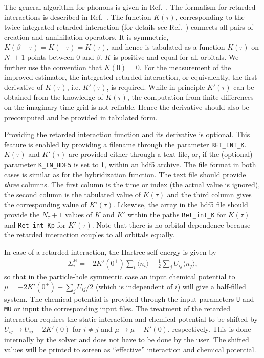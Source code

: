 \documentclass[aps,prb,floatfix,superscriptaddress,twocolumn,notitlepage]{revtex4-1}
\begin{document}
The general algorithm for phonons is given in Ref.~. The formalism for retarded interactions is described in Ref.~. The function $K(\tau)$, corresponding to the twice-integrated retarded interaction (for details see Ref.~) connects all pairs of creation and annihilation operators. It is symmetric, $K(\beta-\tau)=K(-\tau)=K(\tau)$, and hence is tabulated as a function $K(\tau)$ on $N_{\tau}+1$ points between $0$ and $\beta$. $K$ is positive and equal for all orbitals. We further use the convention that $K(0)=0$. For the measurement of the improved estimator, the integrated retarded interaction, or equivalently, the first derivative of $K(\tau)$, i.e. $K'(\tau)$, is required. While in principle $K'(\tau)$ can be obtained from the knowledge of $K(\tau)$, the computation from finite differences on the imaginary time grid is not reliable. Hence the derivative should also be precomputed and be provided in tabulated form.

Providing the retarded interaction function and its derivative is optional. This feature is enabled by providing a filename through the parameter \verb#RET_INT_K#.
$K(\tau)$ and $K'(\tau)$ are provided either through a text file, or, if the (optional) parameter \verb#K_IN_HDF5# is set to 1, within an hdf5 archive.
The file format in both cases is similar as for the hybridization function. The text file should provide \emph{three} columns. The first column is the time or index (the actual value is ignored), the second column is the tabulated value of $K(\tau)$ and the third column gives the corresponding value of $K'(\tau)$.
Likewise, the array in the hdf5 file should provide the $N_{\tau}+1$ values of $K$ and $K'$ within the paths \verb#Ret_int_K# for $K(\tau)$ and \verb#Ret_int_Kp# for $K'(\tau)$.
Note that there is no orbital dependence because the retarded interaction couples to all orbitals equally.

In case of a retarded interaction, the Hartree self-energy is given by
\begin{align}
\Sigma^{\text{H}}_{i} = - 2K'(0^{+})\sum_{i}\langle n_{i}\rangle +\frac{1}{2}\sum_{j}U_{ij}\langle n_{j}\rangle ,
\end{align}
so that in the particle-hole symmetric case an input chemical potential to $\mu=-2K'(0^{+})+\sum_{j}U_{ij}/2$ (which is independent of $i$) will give a half-filled system. The chemical potential is provided through the input parameters \verb#U# and \verb#MU# or input the corresponding input files.
The treatment of the retarded interaction requires the static interaction and chemical potential to be shifted by $U_{ij}\to U_{ij}-2K'(0)$ for $i\neq j$ and $\mu\to \mu+K'(0)$, respectively. This is done internally by the solver and does not have to be done by the user. The shifted values will be printed to screen as ``effective'' interaction and chemical potential.
\end{document}

